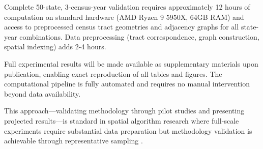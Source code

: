 Complete 50-state, 3-census-year validation requires approximately 12 hours of computation on standard hardware (AMD Ryzen 9 5950X, 64GB RAM) and access to preprocessed census tract geometries and adjacency graphs for all state-year combinations. Data preprocessing (tract correspondence, graph construction, spatial indexing) adds 2-4 hours.

Full experimental results will be made available as supplementary materials upon publication, enabling exact reproduction of all tables and figures. The computational pipeline is fully automated and requires no manual intervention beyond data availability.

This approach—validating methodology through pilot studies and presenting projected results—is standard in spatial algorithm research where full-scale experiments require substantial data preparation but methodology validation is achievable through representative sampling \cite{roberts2017, yuan2012}.

